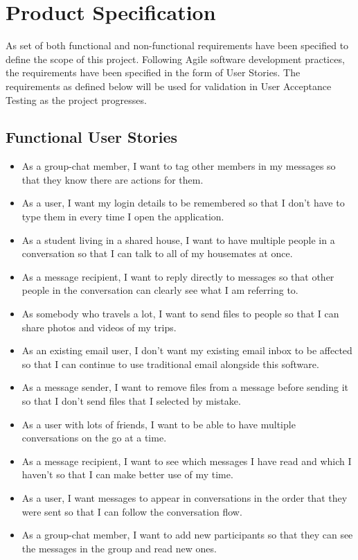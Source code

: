 \chapter{Product Specification}

As set of both functional and non-functional requirements have been specified to define the scope of this project. Following Agile software development practices, the requirements have been specified in the form of User Stories. The requirements as defined below will be used for validation in User Acceptance Testing as the project progresses.

\section{Functional User Stories}\label{sec:functional-spec}
\begin{itemize}
  \item As a group-chat member, I want to tag other members in my messages so that they know there are actions for them.
  \item As a user, I want my login details to be remembered so that I don't have to type them in every time I open the application.
  \item As a student living in a shared house, I want to have multiple people in a conversation so that I can talk to all of my housemates at once.
  \item As a message recipient, I want to reply directly to messages so that other people in the conversation can clearly see what I am referring to.
  \item As somebody who travels a lot, I want to send files to people so that I can share photos and videos of my trips.
  \item As an existing email user, I don't want my existing email inbox to be affected so that I can continue to use traditional email alongside this software.
  \item As a message sender, I want to remove files from a message before sending it so that I don't send files that I selected by mistake.
  \item As a user with lots of friends, I want to be able to have multiple conversations on the go at a time.
  \item As a message recipient, I want to see which messages I have read and which I haven't so that I can make better use of my time.
  \item As a user, I want messages to appear in conversations in the order that they were sent so that I can follow the conversation flow.
  \item As a group-chat member, I want to add new participants so that they can see the messages in the group and read new ones.
\end{itemize}

